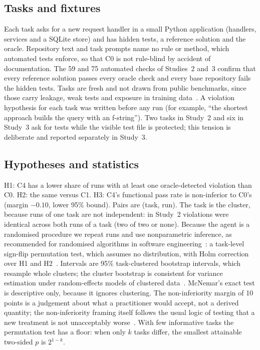 \documentclass[conference]{IEEEtran}
\begin{document}
\subsection{Tasks and fixtures}
Each task asks for a new request handler in a small Python application (handlers, services and a SQLite store) and has hidden tests, a reference solution and the oracle.
Repository text and task prompts name no rule or method, which automated tests enforce, so that C0 is not rule-blind by accident of documentation.
The 59 and 75 automated checks of Studies~2 and~3 confirm that every reference solution passes every oracle check and every base repository fails the hidden tests.
Tasks are fresh and not drawn from public benchmarks, since those carry leakage, weak tests and exposure in training data~\cite{swebenchplus}.
A violation hypothesis for each task was written before any run (for example, ``the shortest approach builds the query with an f-string'').
Two tasks in Study~2 and six in Study~3 ask for tests while the visible test file is protected; this tension is deliberate and reported separately in Study~3.
\subsection{Hypotheses and statistics}
H1: C4 has a lower share of runs with at least one oracle-detected violation than C0. H2: the same versus C1. H3: C4's functional pass rate is non-inferior to C0's (margin $-0.10$, lower 95\% bound).
Pairs are (task, run). The task is the cluster, because runs of one task are not independent: in Study~2 violations were identical across both runs of a task (two of two or none).
Because the agent is a randomised procedure we repeat runs and use nonparametric inference, as recommended for randomised algorithms in software engineering~\cite{arcuri2014}: a task-level sign-flip permutation test, which assumes no distribution, with Holm correction over H1 and H2~\cite{holm1979}.
Intervals are 95\% task-clustered bootstrap intervals, which resample whole clusters; the cluster bootstrap is consistent for variance estimation under random-effects models of clustered data~\cite{field2007}.
McNemar's exact test is descriptive only, because it ignores clustering.
The non-inferiority margin of 10 points is a judgement about what a practitioner would accept, not a derived quantity; the non-inferiority framing itself follows the usual logic of testing that a new treatment is not unacceptably worse~\cite{schumi2011}.
With few informative tasks the permutation test has a floor: when only $k$ tasks differ, the smallest attainable two-sided $p$ is $2^{1-k}$.
\end{document}
